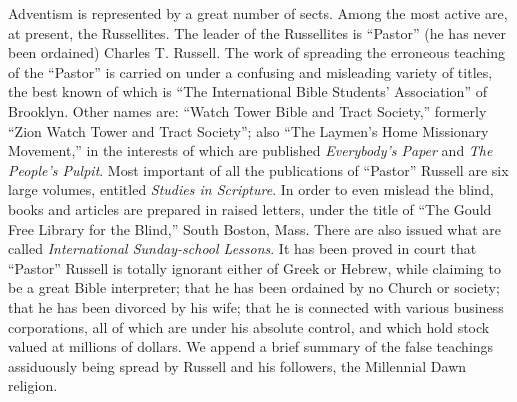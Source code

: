 \documentclass[
]{book}
\begin{document}
Adventism is represented by a great number of sects. Among the most active are, at present, the Russellites. The leader of the Russellites is ``Pastor'' (he has never been ordained) Charles T. Russell. The work of spreading the erroneous teaching of the ``Pastor'' is carried on under a confusing and misleading variety of titles, the best known of which is ``The International Bible Students' Association'' of Brooklyn. Other names are: ``Watch Tower Bible and Tract Society,'' formerly ``Zion Watch Tower and Tract Society''; also ``The Laymen's Home Missionary Movement,'' in the interests of which are published \emph{Everybody's Paper} and \emph{The People's Pulpit}. Most important of all the publications of ``Pastor'' Russell are six large volumes, entitled \emph{Studies in Scripture}. In order to even mislead the blind, books and articles are prepared in raised letters, under the title of ``The Gould Free Library for the Blind,'' South Boston, Mass. There are also issued what are called \emph{International Sunday-school Lessons}. It has been proved in court that ``Pastor'' Russell is totally ignorant either of Greek or Hebrew, while claiming to be a great Bible interpreter; that he has been ordained by no Church or society; that he has been divorced by his wife; that he is connected with various business corporations, all of which are under his absolute control, and which hold stock valued at millions of dollars. We append a brief summary of the false teachings assiduously being spread by Russell and his followers, the Millennial Dawn religion.
\end{document}
